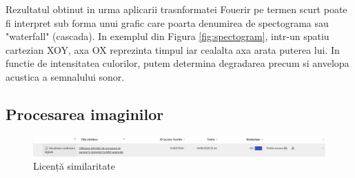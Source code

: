 \documentclass[a4paper, 12pt]{report}
\begin{document}
	Rezultatul obtinut in urma aplicarii trasnformatei Fouerir pe termen scurt poate fi interpret sub forma unui grafic care poarta denumirea de spectograma sau "waterfall" (cascada). In exemplul din Figura \ref{fig:spectogram}, intr-un spatiu cartezian XOY, axa OX reprezinta timpul iar cealalta axa arata puterea lui. In functie de intensitatea culorilor, putem determina degradarea precum si anvelopa acustica a semnalului sonor.
	
	\clearpage
	\subsection{Procesarea imaginilor}
	
	\clearpage
    \printbibliography
    \clearpage
	\begin{figure}[H]
		\begin{center}
			\includegraphics[scale=0.4]{images/plagiat.PNG}
		\end{center}
		\caption{Licență similaritate }
		\label{fig:sim}
	\end{figure} 	
\end{document}

